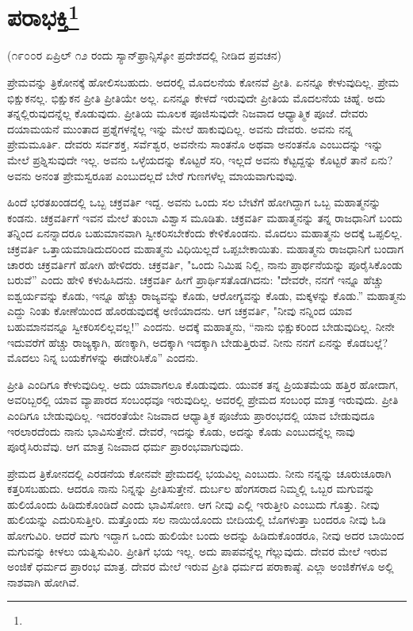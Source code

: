 
\chapter[ಪರಾಭಕ್ತಿ]{ಪರಾಭಕ್ತಿ\protect\footnote{}}

\begin{center}
(೧೯೦೦ರ ಏಪ್ರಿಲ್ ೧೨ ರಂದು ಸ್ಯಾನ್‌ಫ್ರಾನ್ಸಿಸ್ಕೋ ಪ್ರದೇಶದಲ್ಲಿ ನೀಡಿದ ಪ್ರವಚನ)
\end{center}

ಪ್ರೇಮವನ್ನು ತ್ರಿಕೋನಕ್ಕೆ ಹೋಲಿಸಬಹುದು. ಅದರಲ್ಲಿ ಮೊದಲನೆಯ ಕೋನವೆ ಪ್ರೀತಿ. ಏನನ್ನೂ ಕೇಳುವುದಿಲ್ಲ. ಪ್ರೇಮ ಭಿಕ್ಷುಕನಲ್ಲ. ಭಿಕ್ಷುಕನ ಪ್ರೀತಿ ಪ್ರೀತಿಯೇ ಅಲ್ಲ. ಏನನ್ನೂ ಕೇಳದೆ ಇರುವುದೇ ಪ್ರೀತಿಯ ಮೊದಲನೆಯ ಚಿಹ್ನೆ. ಅದು ತನ್ನಲ್ಲಿರುವುದನ್ನೆಲ್ಲ ಕೊಡುವುದು. ಪ್ರೀತಿಯ ಮೂಲಕ ಪೂಜಿಸುವುದೇ ನಿಜವಾದ ಆಧ್ಯಾತ್ಮಿಕ ಪೂಜೆ. ದೇವರು ದಯಾಮಯನೆ ಮುಂತಾದ ಪ್ರಶ್ನೆಗಳನ್ನೆಲ್ಲ ಇನ್ನು ಮೇಲೆ ಹಾಕುವುದಿಲ್ಲ. ಅವನು ದೇವರು. ಅವನು ನನ್ನ ಪ್ರೇಮಮೂರ್ತಿ. ದೇವರು ಸರ್ವಶಕ್ತ, ಸರ್ವೆಶ್ವರ, ಅವನೇನು ಸಾಂತನೊ ಅಥವಾ ಅನಂತನೊ ಎಂಬುದನ್ನು ಇನ್ನು ಮೇಲೆ ಪ್ರಶ್ನಿಸುವುದೇ ಇಲ್ಲ. ಅವನು ಒಳ್ಳೆಯದನ್ನು ಕೊಟ್ಟರೆ ಸರಿ, ಇಲ್ಲದೆ ಅವನು ಕೆಟ್ಟದ್ದನ್ನು ಕೊಟ್ಟರೆ ತಾನೆ ಏನು? ಅವನು ಅನಂತ ಪ್ರೇಮಸ್ವರೂಪ ಎಂಬುದಲ್ಲದೆ ಬೇರೆ ಗುಣಗಳೆಲ್ಲ ಮಾಯವಾಗುವುವು.

ಹಿಂದೆ ಭರತಖಂಡದಲ್ಲಿ ಒಬ್ಬ ಚಕ್ರವರ್ತಿ ಇದ್ದ. ಅವನು ಒಂದು ಸಲ ಬೇಟೆಗೆ ಹೋಗಿದ್ದಾಗ ಒಬ್ಬ ಮಹಾತ್ಮನನ್ನು ಕಂಡನು. ಚಕ್ರವರ್ತಿಗೆ ಇವನ ಮೇಲೆ ತುಂಬಾ ವಿಶ್ವಾಸ ಮೂಡಿತು. ಚಕ್ರವರ್ತಿ ಮಹಾತ್ಮನನ್ನು ತನ್ನ ರಾಜಧಾನಿಗೆ ಬಂದು ತನ್ನಿಂದ ಏನನ್ನಾದರೂ ಬಹುಮಾನವಾಗಿ ಸ್ವೀಕರಿಸಬೇಕೆಂದು ಕೇಳಿಕೊಂಡನು. ಮೊದಲು ಮಹಾತ್ಮನು ಅದಕ್ಕೆ ಒಪ್ಪಲಿಲ್ಲ. ಚಕ್ರವರ್ತಿ ಒತ್ತಾಯಮಾಡಿದುದರಿಂದ ಮಹಾತ್ಮನು ವಿಧಿಯಿಲ್ಲದೆ ಒಪ್ಪಬೇಕಾಯಿತು. ಮಹಾತ್ಮನು ರಾಜಧಾನಿಗೆ ಬಂದಾಗ ಚಾರರು ಚಕ್ರವರ್ತಿಗೆ ಹೋಗಿ ಹೇಳಿದರು. ಚಕ್ರವರ್ತಿ, "ಒಂದು ನಿಮಿಷ ನಿಲ್ಲಿ, ನಾನು ಪ್ರಾರ್ಥನೆಯನ್ನು ಪೂರೈಸಿಕೊಂಡು ಬರುವೆ'' ಎಂದು ಹೇಳಿ ಕಳುಹಿಸಿದನು. ಚಕ್ರವರ್ತಿ ಹೀಗೆ ಪ್ರಾರ್ಥಿಸತೊಡಗಿದನು: "ದೇವರೇ, ನನಗೆ ಇನ್ನೂ ಹೆಚ್ಚು ಐಶ್ವರ್ಯವನ್ನು ಕೊಡು, ಇನ್ನೂ ಹೆಚ್ಚು ರಾಜ್ಯವನ್ನು ಕೊಡು, ಆರೋಗ್ಯವನ್ನು ಕೊಡು, ಮಕ್ಕಳನ್ನು ಕೊಡು.” ಮಹಾತ್ಮನು ಎದ್ದು ನಿಂತು ಕೋಣೆಯಿಂದ ಹೊರಡುವುದಕ್ಕೆ ಅಣಿಯಾದನು. ಆಗ ಚಕ್ರವರ್ತಿ, "ನೀವು ನನ್ನಿಂದ ಯಾವ ಬಹುಮಾನವನ್ನೂ ಸ್ವೀಕರಿಸಲಿಲ್ಲವಲ್ಲ!'' ಎಂದನು. ಅದಕ್ಕೆ ಮಹಾತ್ಮನು, “ನಾನು ಭಿಕ್ಷುಕರಿಂದ ಬೇಡುವುದಿಲ್ಲ. ನೀನೇ ಇದುವರೆಗೆ ಹೆಚ್ಚು ರಾಜ್ಯಕ್ಕಾಗಿ, ಹಣಕ್ಕಾಗಿ, ಅದಕ್ಕಾಗಿ ಇದಕ್ಕಾಗಿ ಬೇಡುತ್ತಿರುವೆ. ನೀನು ನನಗೆ ಏನನ್ನು ಕೊಡಬಲ್ಲೆ? ಮೊದಲು ನಿನ್ನ ಬಯಕೆಗಳನ್ನು ಈಡೇರಿಸಿಕೊ” ಎಂದನು.

ಪ್ರೀತಿ ಎಂದಿಗೂ ಕೇಳುವುದಿಲ್ಲ. ಅದು ಯಾವಾಗಲೂ ಕೊಡುವುದು. ಯುವಕ ತನ್ನ ಪ್ರಿಯತಮೆಯ ಹತ್ತಿರ ಹೋದಾಗ, ಅವರಿಬ್ಬರಲ್ಲಿ ಯಾವ ವ್ಯಾಪಾರದ ಸಂಬಂಧವೂ ಇರುವುದಿಲ್ಲ. ಅವರಲ್ಲಿ ಪ್ರೇಮದ ಸಂಬಂಧ ಮಾತ್ರ ಇರುವುದು. ಪ್ರೀತಿ ಎಂದಿಗೂ ಬೇಡುವುದಿಲ್ಲ. ಇದರಂತೆಯೇ ನಿಜವಾದ ಆಧ್ಯಾತ್ಮಿಕ ಪೂಜೆಯ ಪ್ರಾರಂಭದಲ್ಲಿ ಯಾವ ಬೇಡುವುದೂ ಇರಲಾರದೆಂದು ನಾನು ಭಾವಿಸುತ್ತೇನೆ. ದೇವರೆ, ಇದನ್ನು ಕೊಡು, ಅದನ್ನು ಕೊಡು ಎಂಬುದನ್ನೆಲ್ಲ ನಾವು ಪೂರೈಸಿರುವೆವು. ಆಗ ಮಾತ್ರ ನಿಜವಾದ ಧರ್ಮ ಪ್ರಾರಂಭವಾಗುವುದು.

ಪ್ರೇಮದ ತ್ರಿಕೋನದಲ್ಲಿ ಎರಡನೆಯ ಕೋನವೇ ಪ್ರೇಮದಲ್ಲಿ ಭಯವಿಲ್ಲ ಎಂಬುದು. ನೀನು ನನ್ನನ್ನು ಚೂರುಚೂರಾಗಿ ಕತ್ತರಿಸಬಹುದು. ಆದರೂ ನಾನು ನಿನ್ನನ್ನು ಪ್ರೀತಿಸುತ್ತೇನೆ. ದುರ್ಬಲ ಹೆಂಗಸರಾದ ನಿಮ್ಮಲ್ಲಿ ಒಬ್ಬರ ಮಗುವನ್ನು ಹುಲಿಯೊಂದು ಹಿಡಿದುಕೊಂಡಿದೆ ಎಂದು ಭಾವಿಸೋಣ. ಆಗ ನೀವು ಎಲ್ಲಿ ಇರುತ್ತೀರಿ ಎಂಬುದು ಗೊತ್ತು. ನೀವು ಹುಲಿಯನ್ನು ಎದುರಿಸುತ್ತೀರಿ. ಮತ್ತೊಂದು ಸಲ ನಾಯಿಯೊಂದು ಬೀದಿಯಲ್ಲಿ ಬೊಗಳುತ್ತಾ ಬಂದರೂ ನೀವು ಓಡಿ ಹೋಗುವಿರಿ. ಆದರೆ ಮಗು ಇದ್ದಾಗ ಒಂದು ಹುಲಿಯೇ ಬಂದು ಅದನ್ನು ಹಿಡಿದುಕೊಂಡರೂ, ನೀವು ಅದರ ಬಾಯಿಂದ ಮಗುವನ್ನು ಕೀಳಲು ಯತ್ನಿಸುವಿರಿ. ಪ್ರೀತಿಗೆ ಭಯ ಇಲ್ಲ. ಅದು ಪಾಪವನ್ನೆಲ್ಲ ಗೆಲ್ಲುವುದು. ದೇವರ ಮೇಲೆ ಇರುವ ಅಂಜಿಕೆ ಧರ್ಮದ ಪ್ರಾರಂಭ ಮಾತ್ರ. ದೇವರ ಮೇಲೆ ಇರುವ ಪ್ರೀತಿ ಧರ್ಮದ ಪರಾಕಾಷ್ಠೆ. ಎಲ್ಲಾ ಅಂಜಿಕೆಗಳೂ ಅಲ್ಲಿ ನಾಶವಾಗಿ ಹೋಗಿವೆ.

